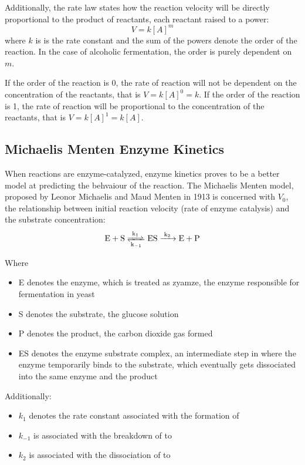 \documentclass{article}
\begin{document}
Additionally, the rate law states how the reaction velocity will be directly proportional to the product of reactants, each reactant raised to a power:
\begin{equation}
    V = k[A]^m
\end{equation}
where $k$ is is the rate constant \parencite{ref} and the sum of the powers denote the order of the reaction. In the case of alcoholic fermentation, the order is purely dependent on $m$.

\medskip

If the order of the reaction is 0, the rate of reaction will not be dependent on the concentration of the reactants, that is $V = k[A]^0 = k$. If the order of the reaction is 1, the rate of reaction will be proportional to the concentration of the reactants, that is $V = k[A]^1 = k[A]$.

\subsection{Michaelis Menten Enzyme Kinetics}
When reactions are enzyme-catalyzed, enzyme kinetics proves to be a better model at predicting the behvaiour of the reaction. The Michaelis Menten model, proposed by Leonor Michaelis and Maud Menten in 1913 is concerned with $V_0$, the relationship between initial reaction velocity (rate of enzyme catalysis) and the substrate concentration:
\begin{equation}
    \ce{E + S <=>[k_1][k_{-1}] ES ->[k_2] E + P}
\end{equation}

Where
\begin{itemize}[topsep=\parskip, noitemsep]
    \item E denotes the enzyme, which is treated as zyamze, the enzyme responsible for fermentation in yeast
    \item S denotes the substrate, the glucose solution
    \item P denotes the product, the carbon dioxide gas formed
    \item ES denotes the enzyme substrate complex, an intermediate step in where the enzyme temporarily binds to the substrate, which eventually gets dissociated into the same enzyme and the product
\end{itemize}

\medskip

Additionally:
\begin{itemize}[topsep=\parskip, noitemsep]
    \item $k_1$ denotes the rate constant associated with the formation of 
    \item $k_{-1}$ is associated with the breakdown of  to 
    \item $k_2$ is associated with the dissociation of  to 
\end{itemize}
\end{document}
